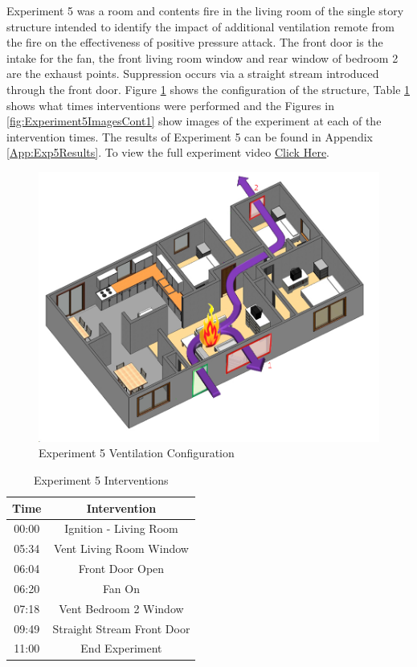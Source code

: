 \documentclass{article}
\begin{document}
Experiment 5 was a room and contents fire in the living room of the single story structure intended to identify the impact of additional ventilation remote from the fire on the effectiveness of positive pressure attack. The front door is the intake for the fan, the front living room window and rear window of bedroom 2 are the exhaust points. Suppression occurs via a straight stream introduced through the front door. Figure \ref{fig:Exp5VentConfig} shows the configuration of the structure, Table \ref{Table:Exp5Interventions} shows what times interventions were performed and the Figures in \ref{fig:Experiment5ImagesCont1} show images of the experiment at each of the intervention times. The results of Experiment 5 can be found in Appendix \ref{App:Exp5Results}. To view the full experiment video \href{https://youtu.be/IezjGcmbLqU}{Click Here}.

\begin{figure}[H]
	\centering
	\includegraphics[width=5in]{0_Images/FireExperiments/Single_Story/Experiment_5.jpg}
	\caption{Experiment 5 Ventilation Configuration}
	\label{fig:Exp5VentConfig}
\end{figure}

\begin{table}[H]
	\centering
	\caption{Experiment 5 Interventions}
	\begin{tabular}{|c|c|} 
		\hline
		Time & Intervention \\ \hline \hline
		00:00 & Ignition - Living Room \\ \hline
		05:34 & Vent Living Room Window \\ \hline
		06:04 & Front Door Open \\ \hline
		06:20 & Fan On \\ \hline
		07:18 & Vent Bedroom 2 Window \\ \hline
		09:49 & Straight Stream Front Door \\ \hline
		11:00 & End Experiment \\ \hline
	\end{tabular}
	\label{Table:Exp5Interventions}
\end{table}
\end{document}
